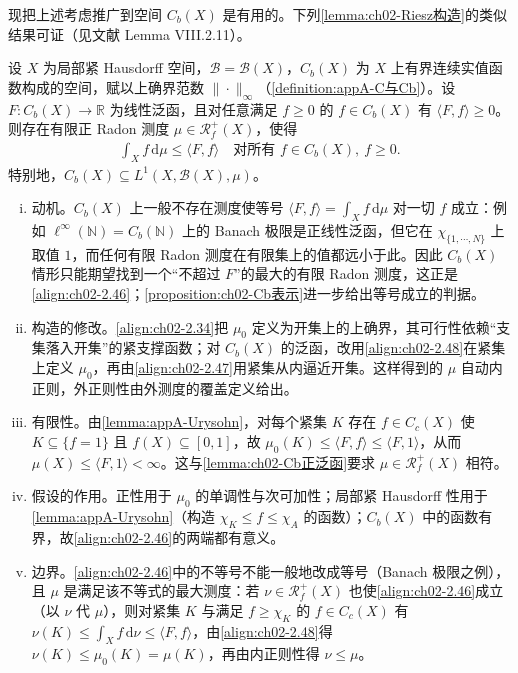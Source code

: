 \documentclass[../../main.tex]{subfiles}%
\begin{document}
现把上述考虑推广到空间 $C_b(X)$ 是有用的。下列\cref{lemma:ch02-Riesz构造}的类似结果可证（见文献\cite{ref45} Lemma VIII.2.11）。

\begin{lemma}\label{lemma:ch02-Cb正泛函}
设 $X$ 为局部紧 Hausdorff 空间，$\mathscr B=\mathscr B(X)$，$C_b(X)$ 为 $X$ 上有界连续实值函数构成的空间，赋以上确界范数 $\|\cdot\|_\infty$（\cref{definition:appA-C与Cb}）。设 $F:C_b(X)\to\mathbb R$ 为线性泛函，且对任意满足 $f\geqslant0$ 的 $f\in C_b(X)$ 有 $\langle F,f\rangle\geqslant0$。则存在有限正 Radon 测度 $\mu\in\mathscr R^+_f(X)$，使得
\begin{align}
\int_Xf\,\mathrm{d}\mu\leqslant\langle F,f\rangle\quad\text{对所有 }f\in C_b(X),\ f\geqslant0. \label{align:ch02-2.46}
\end{align}
特别地，$C_b(X)\subseteq L^1(X,\mathscr B(X),\mu)$。
\end{lemma}

\begin{remark}\label{remark:ch02-Cb动机}
\begin{enumerate}[(i)]
\item 动机。$C_b(X)$ 上一般不存在测度使等号 $\langle F,f\rangle=\int_Xf\,\mathrm{d}\mu$ 对一切 $f$ 成立：例如 $\ell^\infty(\mathbb N)=C_b(\mathbb N)$ 上的 Banach 极限是正线性泛函，但它在 $\chi_{\{1,\cdots,N\}}$ 上取值 $1$，而任何有限 Radon 测度在有限集上的值都远小于此。因此 $C_b(X)$ 情形只能期望找到一个“不超过 $F$”的最大的有限 Radon 测度，这正是\eqref{align:ch02-2.46}；\cref{proposition:ch02-Cb表示}进一步给出等号成立的判据。
\item 构造的修改。\eqref{align:ch02-2.34}把 $\mu_0$ 定义为开集上的上确界，其可行性依赖“支集落入开集”的紧支撑函数；对 $C_b(X)$ 的泛函，改用\eqref{align:ch02-2.48}在紧集上定义 $\mu_0$，再由\eqref{align:ch02-2.47}用紧集从内逼近开集。这样得到的 $\mu$ 自动内正则，外正则性由外测度的覆盖定义给出。
\item 有限性。由\cref{lemma:appA-Urysohn}，对每个紧集 $K$ 存在 $f\in C_c(X)$ 使 $K\subseteq\{f=1\}$ 且 $f(X)\subseteq[0,1]$，故 $\mu_0(K)\leqslant\langle F,f\rangle\leqslant\langle F,1\rangle$，从而 $\mu(X)\leqslant\langle F,1\rangle<\infty$。这与\cref{lemma:ch02-Cb正泛函}要求 $\mu\in\mathscr R^+_f(X)$ 相符。
\item 假设的作用。正性用于 $\mu_0$ 的单调性与次可加性；局部紧 Hausdorff 性用于\cref{lemma:appA-Urysohn}（构造 $\chi_K\leqslant f\leqslant\chi_A$ 的函数）；$C_b(X)$ 中的函数有界，故\eqref{align:ch02-2.46}的两端都有意义。
\item 边界。\eqref{align:ch02-2.46}中的不等号不能一般地改成等号（Banach 极限之例），且 $\mu$ 是满足该不等式的最大测度：若 $\nu\in\mathscr R^+_f(X)$ 也使\eqref{align:ch02-2.46}成立（以 $\nu$ 代 $\mu$），则对紧集 $K$ 与满足 $f\geqslant\chi_K$ 的 $f\in C_c(X)$ 有 $\nu(K)\leqslant\int_Xf\,\mathrm{d}\nu\leqslant\langle F,f\rangle$，由\eqref{align:ch02-2.48}得 $\nu(K)\leqslant\mu_0(K)=\mu(K)$，再由内正则性得 $\nu\leqslant\mu$。
\end{enumerate}
\end{remark}
\end{document}

